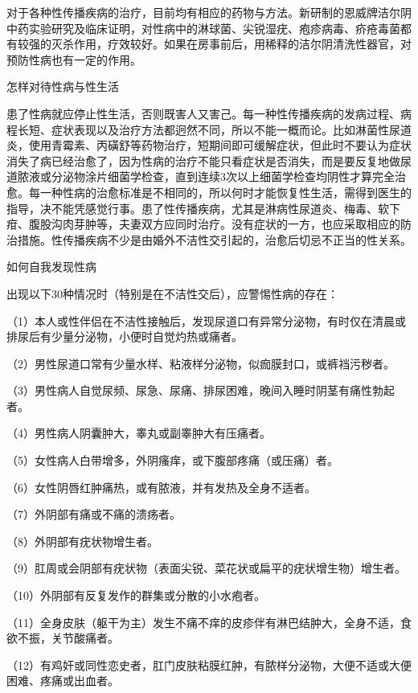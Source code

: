 \documentclass[12pt,UTF8]{ctexbook}
\begin{document}
对于各种性传播疾病的治疗，目前均有相应的药物与方法。新研制的恩威牌洁尔阴中药实验研究及临床证明，对性病中的淋球菌、尖锐湿疣、疱疹病毒、疥疮毒菌都有较强的灭杀作用，疗效较好。如果在房事前后，用稀释的洁尔阴清洗性器官，对预防性病也有一定的作用。





怎样对待性病与性生活


患了性病就应停止性生活，否则既害人又害己。每一种性传播疾病的发病过程、病程长短、症状表现以及治疗方法都迥然不同，所以不能一概而论。比如淋菌性尿道炎，使用青霉素、丙磺舒等药物治疗，短期间即可缓解症状，但此时不要认为症状消失了病已经治愈了，因为性病的治疗不能只看症状是否消失，而是要反复地做尿道脓液或分泌物涂片细菌学检查，直到连续3次以上细菌学检查均阴性才算完全治愈。每一种性病的治愈标准是不相同的，所以何时才能恢复性生活，需得到医生的指导，决不能凭感觉行事。患了性传播疾病，尤其是淋病性尿道炎、梅毒、软下疳、腹股沟肉芽肿等，夫妻双方应同时治疗。没有症状的一方，也应采取相应的防治措施。性传播疾病不少是由婚外不洁性交引起的，治愈后切忌不正当的性关系。





如何自我发现性病


出现以下30种情况时（特别是在不洁性交后），应警惕性病的存在：

（1）本人或性伴侣在不洁性接触后，发现尿道口有异常分泌物，有时仅在清晨或排尿后有少量分泌物，小便时自觉灼热或痛者。

（2）男性尿道口常有少量水样、粘液样分泌物，似痂膜封口，或裤裆污秽者。

（3）男性病人自觉尿频、尿急、尿痛、排尿困难，晚间入睡时阴茎有痛性勃起者。

（4）男性病人阴囊肿大，睾丸或副睾肿大有压痛者。

（5）女性病人白带增多，外阴瘙痒，或下腹部疼痛（或压痛）者。

（6）女性阴唇红肿痛热，或有脓液，并有发热及全身不适者。

（7）外阴部有痛或不痛的溃疡者。

（8）外阴部有疣状物增生者。

（9）肛周或会阴部有疣状物（表面尖锐、菜花状或扁平的疣状增生物）增生者。

（10）外阴部有反复发作的群集或分散的小水疱者。

（11）全身皮肤（躯干为主）发生不痛不痒的皮疹伴有淋巴结肿大，全身不适，食欲不振，关节酸痛者。

（12）有鸡奸或同性恋史者，肛门皮肤粘膜红肿，有脓样分泌物，大便不适或大便困难、疼痛或出血者。
\end{document}
